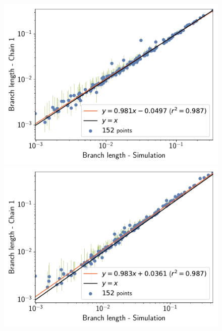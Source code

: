 \documentclass{article}
\begin{document}
    \begin{figure}[t]
        \centering
        \begin{minipage}{0.32\linewidth}
            \includegraphics[width=\linewidth, page=1]{simulations/BranchWise_SimuDiv_SiteMutSelBranchNe_BranchCorrelation_Log10BranchLength}
        \end{minipage}
        \hfill
        \begin{minipage}{0.32\linewidth}
            \includegraphics[width=\linewidth, page=1]{simulations/SimuPoly_SiteMutSelBranchNe_BranchCorrelation_Log10BranchLength}
        \end{minipage}

\end{figure}
\end{document}
